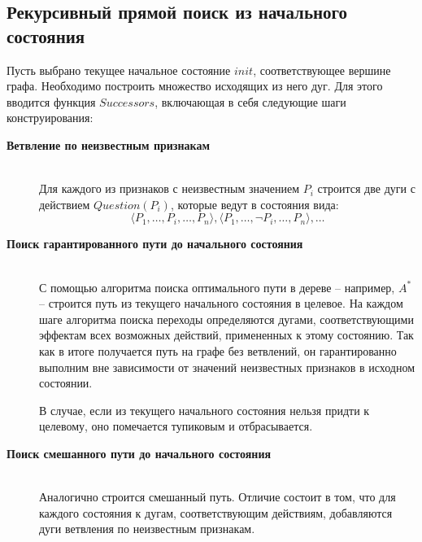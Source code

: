 \subsection{Рекурсивный прямой поиск из начального состояния}

Пусть выбрано текущее начальное состояние $init$, соответствующее вершине графа. Необходимо построить множество исходящих из него дуг. Для этого вводится функция $Successors$, включающая в себя следующие шаги конструирования:

\begin{description}
 \item[\textbf{Ветвление по неизвестным признакам}] \hfill \\
 Для каждого из признаков с неизвестным значением $P_i$ строится две дуги с действием $Question(P_i)$, которые ведут в состояния вида:
  \begin{equation}  
   \langle P_1, \dots, P_i, \dots, P_n \rangle, \langle P_1, \dots, \neg P_i, \dots, P_n \rangle,\dots
  \end{equation}
 \item[\textbf{Поиск гарантированного пути до начального состояния}] \hfill \\
 С помощью алгоритма поиска оптимального пути в дереве -- например, $A^*$ -- строится путь из текущего начального состояния в целевое. На каждом шаге алгоритма поиска переходы определяются дугами, соответствующими эффектам всех возможных действий, примененных к этому состоянию. Так как в итоге получается путь на графе без ветвлений, он гарантированно выполним вне зависимости от значений неизвестных признаков в исходном состоянии.
 
 В случае, если из текущего начального состояния нельзя придти к целевому, оно помечается тупиковым и отбрасывается.
 \item[\textbf{Поиск смешанного пути до начального состояния}] \hfill \\
 Аналогично строится смешанный путь. Отличие состоит в том, что для каждого состояния к дугам, соответствующим действиям, добавляются дуги ветвления по неизвестным признакам.
\end{description}

